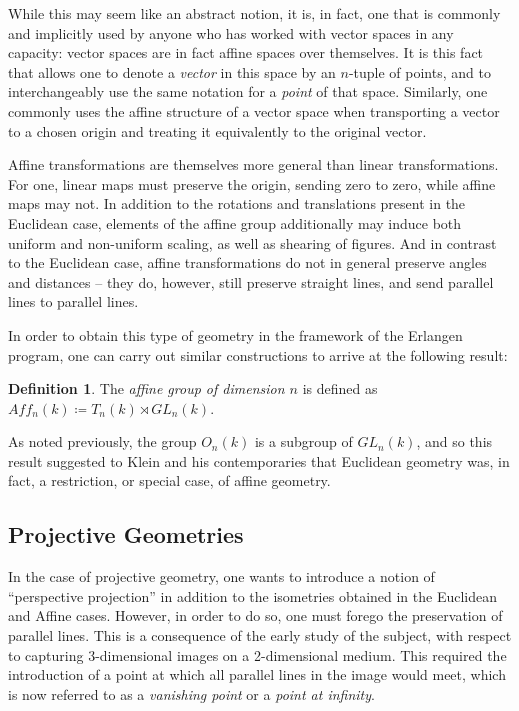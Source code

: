 \documentclass{article}
\theoremstyle{definition}
\newtheorem{definition}[theorem]{Definition} %
\newcommand{\definedas}[0]{\coloneqq}
\begin{document}
While this may seem like an abstract notion, it is, in fact, one that is
commonly and implicitly used by anyone who has worked with vector spaces
in any capacity: vector spaces are in fact affine spaces over
themselves. It is this fact that allows one to denote a \emph{vector} in
this space by an \(n\)-tuple of points, and to interchangeably use the same notation for
a \emph{point} of that space. Similarly, one commonly uses the affine
structure of a vector space when transporting a vector to a chosen
origin and treating it equivalently to the original vector.

Affine transformations are themselves more general than linear
transformations. For one, linear maps must preserve the origin, sending
zero to zero, while affine maps may not. In addition to the rotations
and translations present in the Euclidean case, elements of the affine
group additionally may induce both uniform and non-uniform scaling, as
well as shearing of figures. And in contrast to the Euclidean case,
affine transformations do not in general preserve angles and distances --
they do, however, still preserve straight lines, and send parallel lines
to parallel lines.

In order to obtain this type of geometry in the framework of the
Erlangen program, one can carry out similar constructions to arrive at
the following result:

\begin{definition} The \emph{affine group of dimension \(n\)} is defined as
\(Aff_n(k) \definedas T_n(k) \rtimes GL_n(k)\).
\end{definition}

As noted previously, the group \(O_n(k)\) is a subgroup of \(GL_n(k)\), and
so this result suggested to Klein and his contemporaries that Euclidean
geometry was, in fact, a restriction, or special case, of affine geometry.

\subsection{Projective Geometries}\label{header-n99}

In the case of projective geometry, one wants to introduce a notion of
``perspective projection'' in addition to the isometries obtained in the
Euclidean and Affine cases. However, in order to do so, one must forego
the preservation of parallel lines. This is a consequence of the early
study of the subject, with respect to capturing 3-dimensional images on
a 2-dimensional medium. This required the introduction of a point at
which all parallel lines in the image would meet, which is now referred
to as a \emph{vanishing point} or a \emph{point at infinity}.
\end{document}
